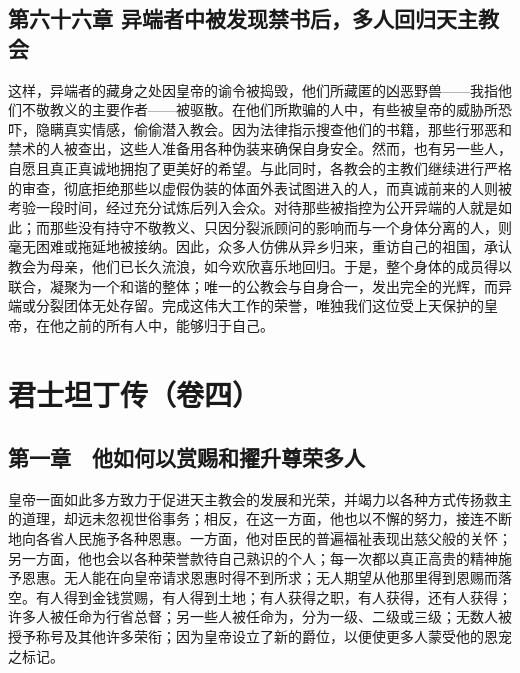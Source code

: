 
\subsection{第六十六章 异端者中被发现禁书后，多人回归天主教会}

这样，异端者的藏身之处因皇帝的谕令被捣毁，他们所藏匿的凶恶野兽——我指他们不敬教义的主要作者——被驱散。在他们所欺骗的人中，有些被皇帝的威胁所恐吓，隐瞒真实情感，偷偷潜入教会。因为法律指示搜查他们的书籍，那些行邪恶和禁术的人被查出，这些人准备用各种伪装来确保自身安全。然而，也有另一些人，自愿且真正真诚地拥抱了更美好的希望。与此同时，各教会的主教们继续进行严格的审查，彻底拒绝那些以虚假伪装的体面外表试图进入的人，而真诚前来的人则被考验一段时间，经过充分试炼后列入会众。对待那些被指控为公开异端的人就是如此；而那些没有持守不敬教义、只因分裂派顾问的影响而与一个身体分离的人，则毫无困难或拖延地被接纳。因此，众多人仿佛从异乡归来，重访自己的祖国，承认教会为母亲，他们已长久流浪，如今欢欣喜乐地回归。于是，整个身体的成员得以联合，凝聚为一个和谐的整体；唯一的公教会与自身合一，发出完全的光辉，而异端或分裂团体无处存留。完成这伟大工作的荣誉，唯独我们这位受上天保护的皇帝，在他之前的所有人中，能够归于自己。\par



\section{君士坦丁传（卷四）}


\subsection{第一章　他如何以赏赐和擢升尊荣多人}

皇帝一面如此多方致力于促进天主教会的发展和光荣，并竭力以各种方式传扬救主的道理，却远未忽视世俗事务；相反，在这一方面，他也以不懈的努力，接连不断地向各省人民施予各种恩惠。一方面，他对臣民的普遍福祉表现出慈父般的关怀；另一方面，他也会以各种荣誉款待自己熟识的个人；每一次都以真正高贵的精神施予恩惠。无人能在向皇帝请求恩惠时得不到所求；无人期望从他那里得到恩赐而落空。有人得到金钱赏赐，有人得到土地；有人获得之职，有人获得，还有人获得；许多人被任命为行省总督；另一些人被任命为，分为一级、二级或三级；无数人被授予称号及其他许多荣衔；因为皇帝设立了新的爵位，以便使更多人蒙受他的恩宠之标记。\par

